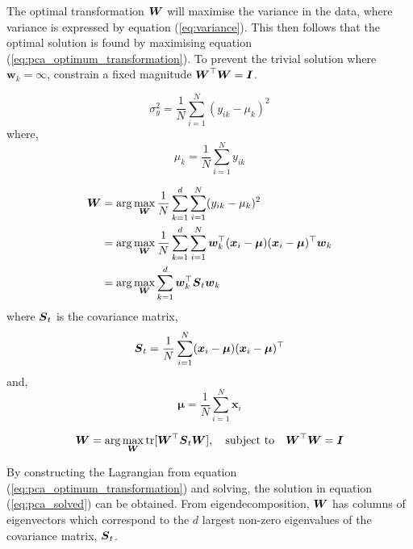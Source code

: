 \bigskip
The optimal transformation ${\boldsymbol{{W}}}$ will maximise the variance in the data, where variance is expressed by equation (\ref{eq:variance}).
This then follows that the optimal solution is found by maximising equation (\ref{eq:pca_optimum_transformation}).
To prevent the trivial solution where $\bm{w}_k = \infty$, constrain a fixed magnitude ${\boldsymbol{{W}}}^\top {\boldsymbol{{W}}} = {\boldsymbol{{I}}}$.


\begin{equation} \label{eq:variance}
    \sigma_y^2 = \frac{1}{N} \sum_{i=1}^{N} (y_{ik} - \mu_k)^2
\end{equation}
where,
\begin{equation*}
    \mu_k = \frac{1}{N} \sum_{i=1}^N y_{ik}
\end{equation*}

\begin{align*}
    {\boldsymbol{{W}}} &=\operatorname*{arg}\operatorname*{max}_{\boldsymbol{{W}}} 
                \frac{1}{N} \sum_{k=1}^{d} \sum_{i=1}^{N} 
                (y_{ik} - \mu_k)^2 \\
            &=\operatorname*{arg}\operatorname*{max}_{\boldsymbol{{W}}} 
                \frac{1}{N} \sum_{k=1}^{d} \sum_{i=1}^{N} 
                {\boldsymbol{{w}}}_k^\top 
                ({\boldsymbol{{x}}}_i - {\boldsymbol{{\mu}}})
                ({\boldsymbol{{x}}}_i - {\boldsymbol{{\mu}}})^\top 
                {\boldsymbol{{w}}}_k \\
            &=\operatorname*{arg}\operatorname*{max}_{\boldsymbol{{W}}} 
                \sum_{k=1}^{d}
                {\boldsymbol{{w}}}_k^\top 
                {\boldsymbol{{S}}}_t
                {\boldsymbol{{w}}}_k \\
\end{align*}
where ${\boldsymbol{{S}}}_t$ is the covariance matrix,
\begin{equation} \label{eq:covariance}
    {\boldsymbol{{S}}}_t = \frac{1}{N} \sum_{i=1}^{N} 
                ({\boldsymbol{{x}}}_i - {\boldsymbol{{\mu}}})
                ({\boldsymbol{{x}}}_i - {\boldsymbol{{\mu}}})^\top 
\end{equation}
and,
\begin{equation*}
    \bm{\mu} = \frac{1}{N} \sum_{i=1}^N \bm{x}_i
\end{equation*}


\begin{equation} \label{eq:pca_optimum_transformation}
    {\boldsymbol{{W}}} = \operatorname*{arg}\operatorname*{max}_{\boldsymbol{{W}}} 
          \operatorname{tr}[{\boldsymbol{{W}}}^\top {\boldsymbol{{S}}}_t {\boldsymbol{{W}}}],
          \quad
    \text{subject to} \quad 
    {\boldsymbol{{W}}}^\top {\boldsymbol{{W}}} = {\boldsymbol{{I}}}
\end{equation}

\bigskip
By constructing the Lagrangian from equation (\ref{eq:pca_optimum_transformation}) and solving, the solution in equation (\ref{eq:pca_solved}) can be obtained.
From eigendecomposition, ${\boldsymbol{{W}}}$ has columns of eigenvectors which correspond to the $d$ largest non-zero eigenvalues of the covariance matrix, ${\boldsymbol{{S}}}_t$.

